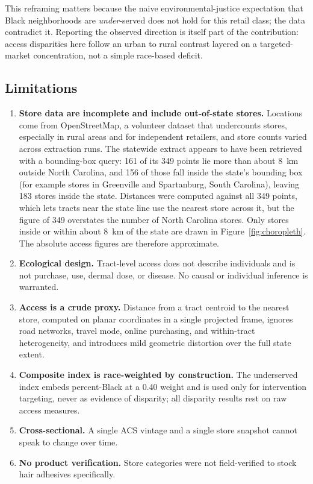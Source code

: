\documentclass[12pt,letterpaper]{article}
\begin{document}
This reframing matters because the naive environmental-justice expectation that
Black neighborhoods are \emph{under}-served does not hold for this retail class;
the data contradict it. Reporting the observed direction is itself part of the
contribution: access disparities here follow an urban to rural contrast layered
on a targeted-market concentration, not a simple race-based deficit.

\subsection{Limitations}

\begin{enumerate}
\item \textbf{Store data are incomplete and include out-of-state stores.}
Locations come from OpenStreetMap, a volunteer dataset that undercounts stores,
especially in rural areas and for independent retailers, and store counts varied
across extraction runs. The statewide extract appears to have been retrieved with
a bounding-box query: 161 of its 349 points lie more than about 8~km outside North
Carolina, and 156 of those fall inside the state's bounding box (for example
stores in Greenville and Spartanburg, South Carolina), leaving 183 stores inside
the state. Distances were computed against all 349 points, which lets tracts near
the state line use the nearest store across it, but the figure of 349 overstates
the number of North Carolina stores. Only stores inside or within about 8~km of
the state are drawn in Figure~\ref{fig:choropleth}. The absolute access figures
are therefore approximate.
\item \textbf{Ecological design.} Tract-level access does not describe
individuals and is not purchase, use, dermal dose, or disease. No causal or
individual inference is warranted.
\item \textbf{Access is a crude proxy.} Distance from a tract centroid to the
nearest store, computed on planar coordinates in a single projected frame,
ignores road networks, travel mode, online purchasing, and within-tract
heterogeneity, and introduces mild geometric distortion over the full state
extent.
\item \textbf{Composite index is race-weighted by construction.} The underserved
index embeds percent-Black at a 0.40 weight and is used only for intervention
targeting, never as evidence of disparity; all disparity results rest on raw
access measures.
\item \textbf{Cross-sectional.} A single ACS vintage and a single store snapshot
cannot speak to change over time.
\item \textbf{No product verification.} Store categories were not field-verified
to stock hair adhesives specifically.
\end{enumerate}
\end{document}

